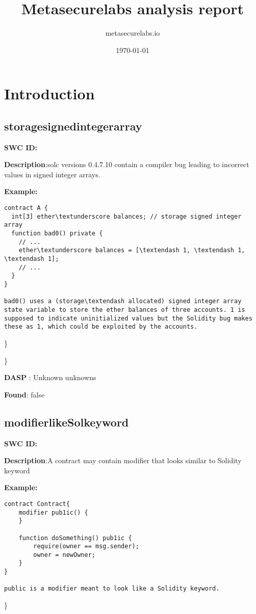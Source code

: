 \documentclass{article}
\title{Metasecurelabs analysis report}
\author{metasecurelabs.io }
\date{\today}
\begin{document}
 

\maketitle 

\section{Introduction} 
\subsection{storage\textunderscore signed\textunderscore integer\textunderscore array} 
\textbf{SWC \textunderscore ID:} 

\textbf{Description}:solc versions 0.4.7.10 contain a compiler bug leading to incorrect values in signed integer arrays.


\textbf{Example:} 
\begin{verbatim}
contract A {
  int[3] ether\textunderscore balances; // storage signed integer array
  function bad0() private {
    // ...
    ether\textunderscore balances = [\textendash 1, \textendash 1, \textendash 1];
    // ...
  }
}

bad0() uses a (storage\textendash allocated) signed integer array state variable to store the ether balances of three accounts. 1 is supposed to indicate uninitialized values but the Solidity bug makes these as 1, which could be exploited by the accounts.

\end{verbatim}\} 

\} 

\textbf{DASP} : Unknown unknowns

\textbf{Found}: false

\subsection{modifier\textunderscore like\textunderscore Sol\textunderscore keyword} 
\textbf{SWC \textunderscore ID:} 

\textbf{Description}:A contract may contain modifier that looks similar to Solidity keyword


\textbf{Example:} 
\begin{verbatim}
contract Contract{
    modifier pub1ic() {
    }

    function doSomething() pub1ic {
        require(owner == msg.sender);
        owner = newOwner;
    }
}

public is a modifier meant to look like a Solidity keyword.

\end{verbatim}\} 
\end{document}
